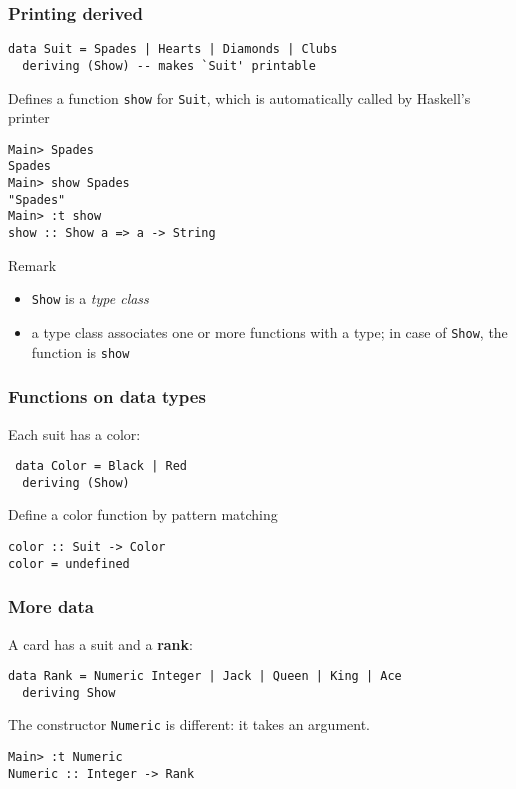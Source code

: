 \documentclass{beamer}
\begin{document}
\begin{frame}
  \frametitle{Printing derived}
\begin{lstlisting}
data Suit = Spades | Hearts | Diamonds | Clubs
  deriving (Show) -- makes `Suit' printable
\end{lstlisting}
Defines a function \lstinline{show} for \lstinline{Suit}, which is
automatically called by Haskell's printer
\begin{verbatim}
Main> Spades
Spades
Main> show Spades
"Spades"
Main> :t show 
show :: Show a => a -> String
\end{verbatim}
\begin{exampleblock}{Remark}
  \begin{itemize}
  \item \lstinline{Show} is a \emph{type class}
  \item a type class associates one or more functions with a type; in
    case of \lstinline{Show}, the function is \lstinline{show}
  \end{itemize}
\end{exampleblock}
\end{frame}
\begin{frame}
  \frametitle{Functions on data types}
   Each suit has a color:
\begin{lstlisting}
 data Color = Black | Red
  deriving (Show)
\end{lstlisting}
   Define a color function by pattern matching
\begin{lstlisting}
color :: Suit -> Color
color = undefined
\end{lstlisting}
\end{frame}
\begin{frame}
  \frametitle{More data}
  A card has a suit and a \textbf{rank}:
\begin{lstlisting}
data Rank = Numeric Integer | Jack | Queen | King | Ace
  deriving Show
\end{lstlisting}
The constructor \lstinline{Numeric} is different: it takes an argument.
\begin{verbatim}
Main> :t Numeric
Numeric :: Integer -> Rank
\end{verbatim}
\end{frame}
\end{document}
